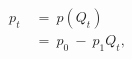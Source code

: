 \begin{equation}
\begin{split}
     p_{t} \ 
     & = \ p(Q_{t}) \\
     & = \ p_{0} \ - \ p_{1}Q_{t},
\end{split}
\label{Equation:DCDP-Model_Oil-Prices}
\end{equation}